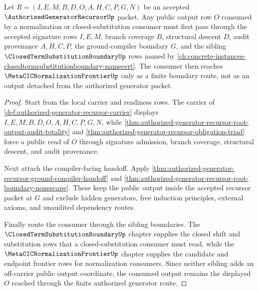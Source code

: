 \begin{theorem}
\label{thm:authorized-generator-recursor-root-normalization-boundary}
Let $R=(I,E,M,B,D,O,A,H,C,P,G,N)$ be an accepted $\AuthorizedGeneratorRecursorUp$ packet. Any public output row $O$ consumed by a normalization or closed-substitution consumer must first pass through the accepted signature rows $I,E,M$, branch coverage $B$, structural descent $D$, audit provenance $A,H,C,P$, the ground-compiler boundary $G$, and the sibling $\ClosedTermSubstitutionBoundaryUp$ rows named by \autoref{ch:concrete-instances-closedtermsubstitutionboundary-namecert}. The consumer then reaches $\MetaCICNormalizationFrontierUp$ only as a finite boundary route, not as an output detached from the authorized generator packet.
\end{theorem}
\begin{proof}
Start from the local carrier and readiness rows. The carrier of \autoref{def:authorized-generator-recursor-carrier} displays $I,E,M,B,D,O,A,H,C,P,G,N$, while \autoref{thm:authorized-generator-recursor-root-output-audit-totality} and \autoref{thm:authorized-generator-recursor-obligation-triad} force a public read of $O$ through signature admission, branch coverage, structural descent, and audit provenance.

Next attach the compiler-facing handoff. Apply \autoref{thm:authorized-generator-recursor-ground-compiler-handoff} and \autoref{thm:authorized-generator-recursor-root-boundary-nonescape}. These keep the public output inside the accepted recursor packet at $G$ and exclude hidden generators, free induction principles, external axioms, and unaudited dependency routes.

Finally route the consumer through the sibling boundaries. The $\ClosedTermSubstitutionBoundaryUp$ chapter supplies the closed shift and substitution rows that a closed-substitution consumer must read, while the $\MetaCICNormalizationFrontierUp$ chapter supplies the candidate and endpoint frontier rows for normalization consumers. Since neither sibling adds an off-carrier public output coordinate, the consumed output remains the displayed $O$ reached through the finite authorized generator route.
\end{proof}

